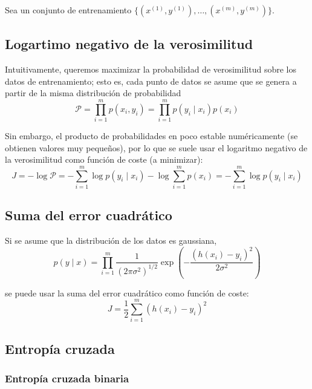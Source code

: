 Sea un conjunto de entrenamiento $\{(x^{(1)}, y^{(1)}), \ldots, (x^{(m)}, y^{(m)})\}$. 

\subsection{Logartimo negativo de la verosimilitud}

Intuitivamente, queremos maximizar la probabilidad de verosimilitud sobre los datos de entrenamiento; esto es, cada punto de datos se asume que se genera a partir de la misma distribución de probabilidad
\begin{equation}
\mathcal{P} = \prod_{i = 1}^m p(x_i, y_i) = \prod_{i = 1}^m p(y_i \mid x_i) p(x_i)
\end{equation}

Sin embargo, el producto de probabilidades en poco estable numéricamente (se obtienen valores muy pequeños), por lo que se suele usar el logaritmo negativo de la verosimilitud como función de coste (a minimizar):
\begin{equation}
J = -\log \mathcal{P} = -\sum_{i = 1}^m \log p(y_i \mid x_i) - \log \sum_{i = 1}^m p(x_i) = -\sum_{i = 1}^m \log p(y_i \mid x_i)
\end{equation}

\subsection{Suma del error cuadrático}

\noindent Si se asume que la distribución de los datos es gaussiana,
\begin{equation}
p(y \mid x) = \prod_{i = 1}^m \frac{1}{(2\pi \sigma^2)^{1/2}} \exp\left(-\frac{(h(x_i) - y_i)^2}{2\sigma^2}\right)
\end{equation} 

\noindent se puede usar la suma del error cuadrático como función de coste:
\begin{equation}
J = \frac{1}{2} \sum_{i = 1}^m (h(x_i) - y_i)^2
\end{equation}

\subsection{Entropía cruzada}

\subsubsection{Entropía cruzada binaria}

